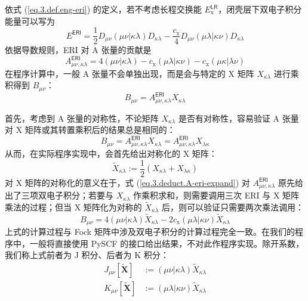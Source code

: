 依式 (\ref{eq.3.def.eng-eri}) 的定义，若不考虑长程交换能 $E_\mathrm{x}^\textsf{LR}$，闭壳层下双电子积分能量可以写为
\begin{equation*}
  E^\textsf{ERI} = \frac{1}{2} D_{\mu \nu} (\mu \nu | \kappa \lambda) D_{\kappa \lambda} - \frac{c_\mathrm{x}}{4} D_{\mu \nu} (\mu \lambda | \kappa \nu) D_{\kappa \lambda}
\end{equation*}
依据导数规则，ERI 对 A 张量的贡献是
\begin{equation}
  \label{eq.3.deduct.A-eri-expand}
  A_{\mu \nu, \kappa \lambda}^\textsf{ERI} = 4 (\mu \nu | \kappa \lambda) - c_\mathrm{x} (\mu \lambda | \kappa \nu) - c_\mathrm{x} (\mu \kappa | \lambda \nu)
\end{equation}
在程序计算中，一般 A 张量不会单独出现，而是会与特定的 X 矩阵 $X_{\kappa \lambda}$ 进行乘积得到 $B_{\mu \nu}$：
\begin{equation}
  B_{\mu \nu} = A_{\mu \nu, \kappa \lambda}^\textsf{ERI} X_{\kappa \lambda}
\end{equation}

首先，考虑到 A 张量的对称性，不论矩阵 $X_{\kappa \lambda}$ 是否有对称性，容易验证 A 张量对 X 矩阵或其转置乘积后的结果总是相同的：
\begin{equation*}
  B_{\mu \nu} = A_{\mu \nu, \kappa \lambda}^\textsf{ERI} X_{\kappa \lambda} = A_{\mu \nu, \kappa \lambda}^\textsf{ERI} X_{\lambda \kappa}
\end{equation*}
从而，在实际程序实现中，会首先给出对称化的 X 矩阵：
\begin{equation*}
  \tilde X_{\kappa \lambda} := \frac{1}{2} \left( X_{\kappa \lambda} + X_{\lambda \kappa} \right)
\end{equation*}
对 X 矩阵的对称化的意义在于，式 (\ref{eq.3.deduct.A-eri-expand}) 对 $A_{\mu \nu, \kappa \lambda}^\textsf{ERI}$ 原先给出了三项双电子积分；若要与 $X_{\kappa \lambda}$ 作乘积求和，则需要调用三次 ERI 与 X 矩阵乘法的过程；但当 X 矩阵化为对称的 $\tilde X_{\kappa \lambda}$ 后，则可以验证只需要两次乘法调用：
\begin{equation}
  \label{eq.3.A-contract-AO-JK}
  B_{\mu \nu} = 4 (\mu \nu | \kappa \lambda) \tilde X_{\kappa \lambda} - 2 c_\mathrm{x} (\mu \lambda | \kappa \nu) \tilde X_{\kappa \lambda}
\end{equation}
上式的计算过程与 Fock 矩阵中涉及双电子积分的计算过程完全一致。在我们的程序中，一般将直接使用 PySCF 的接口给出结果，不对此作程序实现。除开系数，我们称上式前者为 J 积分、后者为 K 积分：
\begin{align}
  \label{eq.3.def.J}
  J_{\mu \nu} [\tilde{\mathbf{X}}] &:= (\mu \nu | \kappa \lambda) \tilde X_{\kappa \lambda} \\
  \label{eq.3.def.K}
  K_{\mu \nu} [\tilde{\mathbf{X}}] &:= (\mu \lambda | \kappa \nu) \tilde X_{\kappa \lambda}
\end{align}

